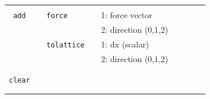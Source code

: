 \documentclass[11pt]{article}
\begin{document}
\begin{center}
\begin{tabular}{cclclclll}
    \hline
                                   && && && \\
    \verb!add! && \verb!force! && 1: force vector && \\
    $\mbox{}$   &&             && 2: direction (0,1,2) && \\
    $\mbox{}$   && \verb!tolattice! && 1: dx (scalar) && \\
    $\mbox{}$   &&             && 2: direction (0,1,2) && \\
                                   && && && \\
    \hline
                                   && && && \\
    \verb!clear! & & && && \\
                                   && && && \\
    \hline
 
                                   && && && \\
 
  \end{tabular}

\end{center}
\end{document}
